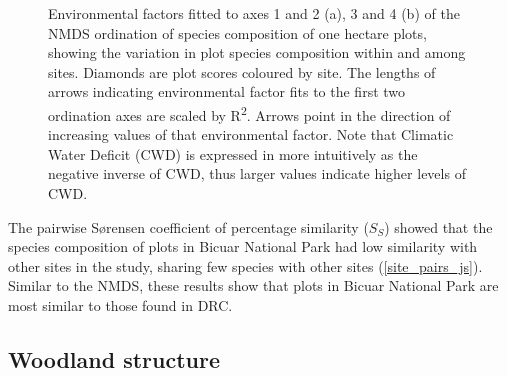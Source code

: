 \documentclass[diversity,article,submit,moreauthors,pdftex]{Definitions/mdpi}
\begin{document}
\begin{figure}[H]
	\centering
    \qquad
{}%
\caption{Environmental factors fitted to axes 1 and 2 (a), 3 and 4 (b) of the NMDS ordination of species composition of one hectare plots, showing the variation in plot species composition within and among sites. Diamonds are plot scores coloured by site. The lengths of arrows indicating environmental factor fits to the first two ordination axes are scaled by R\textsuperscript{2}. Arrows point in the direction of increasing values of that environmental factor. Note that Climatic Water Deficit (CWD) is expressed in more intuitively as the negative inverse of CWD, thus larger values indicate higher levels of CWD.}
\end{figure}

The pairwise S\o{}rensen coefficient of percentage similarity ($S_{S}$) showed that the species composition of plots in Bicuar National Park had low similarity with other sites in the study, sharing few species with other sites (\autoref{site_pairs_js}). Similar to the NMDS, these results show that plots in Bicuar National Park are most similar to those found in DRC. 



\subsection{Woodland structure}
\end{document}
